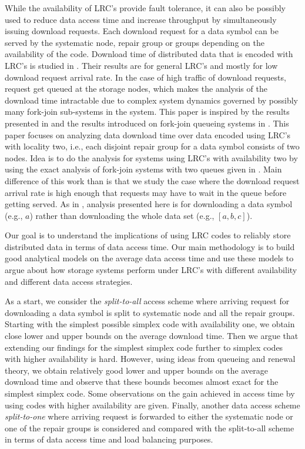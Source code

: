 \documentclass[sigconf,draft]{acmart}
\newcommand\mehmet[1]{\add[MA]{#1}}
\begin{document}
While the availability of LRC's provide fault tolerance, it can also be possibly used to reduce data access time and increase throughput by simultaneously issuing download requests. Each download request for a data symbol can be served by the systematic node, repair group or groups depending on the availability of the code. Download time of distributed data that is encoded with LRC's is studied in \cite{kadhe2015analyzing}. Their results are for general LRC's and mostly for low download request arrival rate. In the case of high traffic of download requests, request get queued at the storage nodes, which makes the analysis of the download time intractable due to complex system dynamics governed by possibly many fork-join sub-systems in the system. This paper is inspired by the results presented in \cite{kadhe2015analyzing} and the results introduced on fork-join queueing systems in \cite{nelson1988approximate}. This paper focuses on analyzing data download time over data encoded using LRC's with locality two, i.e., each disjoint repair group for a data symbol consists of two nodes. Idea is to do the analysis for systems using LRC's with availability two by using the exact analysis of fork-join systems with two queues given in \cite{nelson1988approximate}. Main difference of this work than \cite{kadhe2015analyzing} is that we study the case where the download request arrival rate is high enough that requests may have to wait in the queue before getting served. As in \cite{kadhe2015analyzing}, analysis presented here is for downloading a data symbol (e.g., $a$) rather than downloading the whole data set (e.g., $[a,b,c]$).

Our goal is to understand the implications of using LRC codes to reliably store distributed data in terms of data access time. Our main methodology is to build good analytical models on the average data access time and use these models to argue about how storage systems perform under LRC's with different availability and different data access strategies. \mehmet{Should we define data access strategies before?}

As a start, we consider the \emph{split-to-all} access scheme where arriving request for downloading a data symbol is split to systematic node and all the repair groups. Starting with the simplest possible simplex code with availability one, we obtain close lower and upper bounds on the average download time. Then we argue that extending our findings for the simplest simplex code further to simplex codes with higher availability is hard. However, using ideas from queueing and renewal theory, we obtain relatively good lower and upper bounds on the average download time and observe that these bounds becomes almost exact for the simplest simplex code. Some observations on the gain achieved in access time by using codes with higher availability are given. Finally, another data access scheme \emph{split-to-one} where arriving request is forwarded to either the systematic node or one of the repair groups is considered and compared with the split-to-all scheme in terms of data access time and load balancing purposes.
\end{document}
